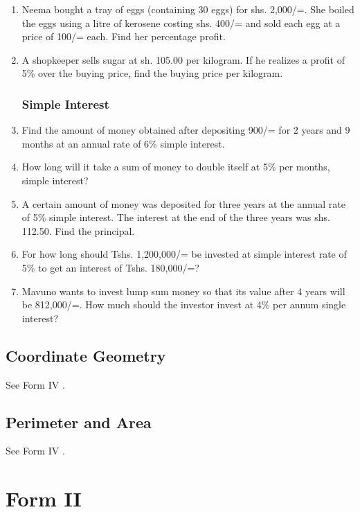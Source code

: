 \begin{enumerate}
	\item Neema bought a tray of eggs (containing 30 eggs) for shs. 2,000/=. She boiled the eggs using a litre of kerosene costing shs. 400/= and sold each egg at a price of 100/= each. Find her percentage profit.
	
	\item A shopkeeper sells sugar at sh. 105.00 per kilogram. If he realizes a profit of 5\% over the buying price, find the buying price per kilogram.
	
	
		\subsubsection{Simple Interest}
	\item Find the amount of money obtained after depositing 900/= for 2 years and 9 months at an annual rate of 6\% simple interest.
	
	\item How long will it take a sum of money to double itself at 5\% per months, simple interest?
	
	\item A certain amount of money was deposited for three years at the annual rate of 5\% simple interest. The interest at the end of the three years was shs. 112.50. Find the principal.
	
	\item For how long should Tshs. 1,200,000/= be invested at simple interest rate of 5\% to get an interest of Tshs. 180,000/=?
	
	\item Mavuno wants to invest lump sum money so that its value after 4 years will be 812,000/=. How much should the investor invest at 4\% per annum single interest?

\end{enumerate}

	\subsection{Coordinate Geometry}

	See Form IV .
	
	\subsection{Perimeter and Area}

	See Form IV .

\section{Form II}

